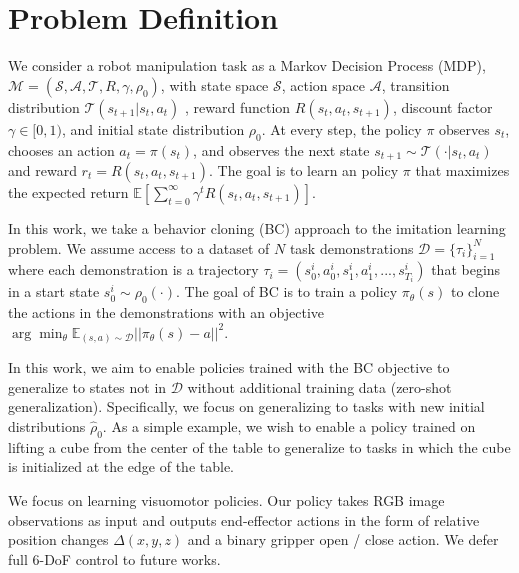 \documentclass[letterpaper, 10 pt, conference]{ieeeconf}
\newcommand{\rui}[1]{\hl{[Rui: #1]}}
\begin{document}
\section{Problem Definition}
We consider a robot manipulation task as a Markov Decision Process (MDP), $\mathcal{M} = (\mathcal{S}, \mathcal{A}, \mathcal{T}, R, \gamma, \rho_0)$, with state space $\mathcal{S}$, action space $\mathcal{A}$, transition distribution $\mathcal{T}(s_{t+1} | s_t, a_t)$ , reward function $R(s_t, a_t, s_{t+1})$, discount factor $\gamma \in [0, 1)$, and initial state distribution $\rho_0$. At every step, the policy $\pi$ observes $s_t$, chooses an action $a_t = \pi(s_t)$, and observes the next state $s_{t+1} \sim \mathcal{T}(\cdot | s_t, a_t)$ and reward $r_t = R(s_t, a_t, s_{t+1})$. The goal is to learn an policy $\pi$ that maximizes the expected return $\mathbb{E}[\sum_{t=0}^{\infty} \gamma^t R(s_t, a_t, s_{t+1})]$.

In this work, we take a behavior cloning (BC) approach to the imitation learning problem. We assume access to a dataset of $N$ task demonstrations $\mathcal{D} = \{\tau_i\}_{i=1}^N$ where each demonstration is a trajectory $\tau_i = (s^i_0, a^i_0, s^i_1, a^i_1, ..., s^i_{T_i})$ that begins in a start state $s^i_0 \sim \rho_0(\cdot)$. The goal of BC is to train a policy $\pi_{\theta}(s)$ to clone the actions in the demonstrations with an objective $\arg\min_{\theta} \mathbb{E}_{(s, a) \sim \mathcal{D}} ||\pi_{\theta}(s) - a||^2$.

In this work, we aim to enable policies trained with the BC objective to generalize to states not in $\mathcal{D}$ without additional training data (zero-shot generalization). Specifically, we focus on generalizing to tasks with new initial distributions $\hat{\rho}_0$. As a simple example, we wish to enable a policy trained on lifting a cube from the center of the table to generalize to tasks in which the cube is initialized at the edge of the table.

We focus on learning visuomotor policies. Our policy takes RGB image observations as input and outputs end-effector actions in the form of relative position changes $\Delta(x, y, z)$ and a binary gripper open / close action. We defer full 6-DoF control to future works.
\end{document}
